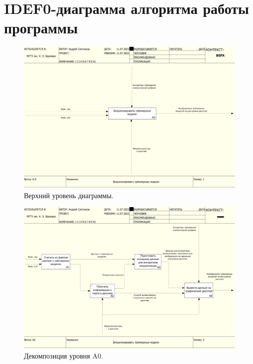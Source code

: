 \chapter{IDEF0-диаграмма алгоритма работы программы}
\label{cha:appendix1}

\begin{figure}[h]
	\centering
	\includegraphics[width=\textwidth ]{img/IDEF0/A0.jpg}
	\caption{Верхний уровень диаграммы.}
\end{figure} 

\begin{figure}[h]
	\centering
	\includegraphics[width=\textwidth ]{img/IDEF0/A0_decomposition.jpg}
	\caption{Декомпозиция уровня A0.}
\end{figure} 

